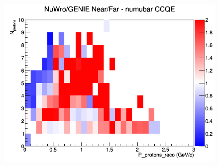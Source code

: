 \documentclass[12pt]{article}
\begin{document}
\begin{figure}[h]
\endminipage
{}
\includegraphics[width=\linewidth]{eff_N_P/GAr/protons/ratios/CCQE_NuWro_GENIE_numubar_NF_N_P.png}
\endminipage
\newline
\end{figure}
\clearpage
\end{document}
